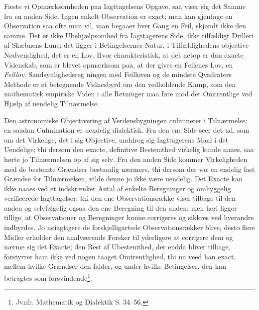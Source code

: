 \documentclass[12pt,a4paper]{book}
\begin{document}
Fæste vi Opmærksomheden paa Iagttagelsens Opgave, saa viser sig det
Samme fra en anden Side. Ingen enkelt Observation er exact; man kan
gjentage en Observation saa ofte man vil, man begaaer hver Gang en
Feil, skjøndt ikke den samme. Det er ikke Ubehjælpsomhed fra
Iagttagerens Side, ikke tilfældigt Drilleri af Skæbnens Lune; det
ligger i Betingelsernes Natur, i Tilfældighedens objective
Nødvendighed, det er en Lov. Hvor charakteristisk, at det netop er
dan exacte Videnskab, som er blevet opmærksom paa, at der gives en
Feilenes Lov, en \emph{Feillov}. Sandsynlighedsreg\-%
ningen med Feilloven og de mindste Qvadraters Methode er et betegnende
Vidnesbyrd om den vedholdende Kamp, som den mathematisk empiriske Viden
i alle Retninger maa føre mod det Omtrentlige ved Hjælp af uendelig
Tilnærmelse.

Den astronomiske Objectivering af Verdensbygningen culminerer i
Tilnærmelse; en saadan Culmination er uendelig dialektisk. Fra den ene
Side seer det ud, som om det Virkelige, det i sig Objective, unddrog
sig Iagttagerens Maal i det Uendelige; thi dersom den exacte,
definitive Bestemthed virkelig kunde naaes, saa hørte jo Tilnærmelsen
op af sig selv. Fra den anden Side kommer Virkeligheden med de bestemte
Grændser bestandig nærmere, thi dersom der var en endelig fast Grændse
for Tilnærmelsen, vilde denne jo ikke være uendelig. Det Exacte kan
ikke naaes ved et indskrænket Antal af enkelte Beregninger og
omhyggelig verificerede Iagttagelser; thi den ene Observationsrække
viser tilbage til den anden og selvfølgelig ogsaa den ene Beregning til
den anden; men heri ligger tillige, at Observationer og Beregninger
kunne corrigeres og sikkres ved hverandre indbyrdes. Jo nøiagtigere de
forskjelligartede Observationsrækker blive, desto flere Midler erholder
den analyserende Forsker til yderligere at corrigere dem og nærme sig
det Exacte; den Rest af Ubestemthed, der endda bliver tilbage,
forstyrrer ham ikke ved nogen taaget Omtrentlighed, thi nu veed han
exact, mellem hvilke Grændser den falder, og under hvilke Betingelser,
den kan betragtes som forsvindende\footnote{%
Jvnfr. Mathematik og Dialektik S. 34--56.}.
\end{document}
